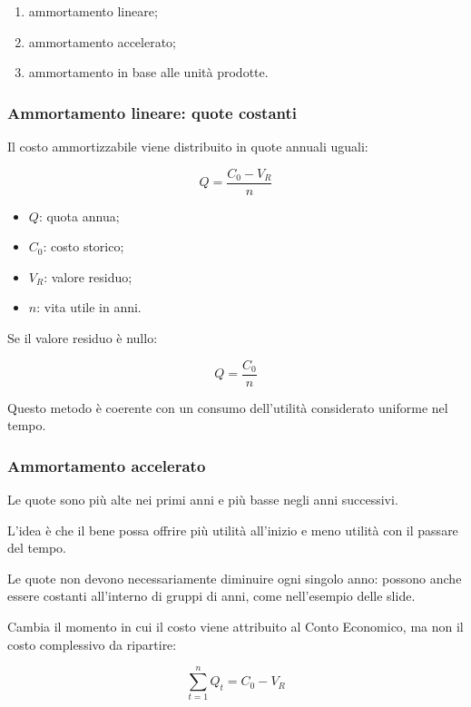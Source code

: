 \begin{enumerate}
    \item ammortamento lineare;
    \item ammortamento accelerato;
    \item ammortamento in base
    alle unità prodotte.
\end{enumerate}


\subsubsection*{Ammortamento lineare:
quote costanti}

\noindent Il costo ammortizzabile
viene distribuito in quote annuali uguali:

\[
\boxed{
Q=\frac{C_0-V_R}{n}
}
\]

\begin{itemize}
    \item $Q$: quota annua;
    \item $C_0$: costo storico;
    \item $V_R$: valore residuo;
    \item $n$: vita utile in anni.
\end{itemize}

\noindent Se il valore residuo è nullo:

\[
\boxed{
Q=\frac{C_0}{n}
}
\]

\noindent Questo metodo è coerente
con un consumo dell'utilità
considerato uniforme nel tempo.


\subsubsection*{Ammortamento accelerato}

\noindent Le quote sono più alte
nei primi anni
e più basse negli anni successivi.

\noindent L'idea è che il bene
possa offrire più utilità all'inizio
e meno utilità con il passare del tempo.

\noindent Le quote non devono
necessariamente diminuire ogni singolo anno:
possono anche essere costanti
all'interno di gruppi di anni,
come nell'esempio delle slide.

\medskip

\noindent Cambia il momento
in cui il costo viene attribuito
al Conto Economico,
ma non il costo complessivo
da ripartire:

\[
\boxed{
\sum_{t=1}^{n}Q_t=C_0-V_R
}
\]

